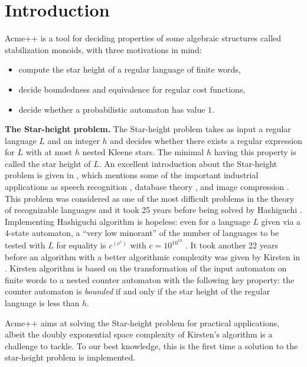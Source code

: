 \section{Introduction}

Acme++ is a tool for deciding properties of some algebraic structures called stabilization monoids,
with three motivations in mind:
\begin{itemize}
\item compute the star height of a regular language of finite words,
\item decide boundedness and equivalence for regular cost functions,
\item decide whether a probabilistic automaton has value $1$.
\end{itemize}

\textbf{The Star-height problem.} The Star-height problem \cite{Eggan63} takes as input a regular language $L$ and an integer $h$ and decides whether there exists a regular expression for $L$ with at most $h$ nested Kleene stars.
The minimal $h$ having this property is called the star height of $L$. 
An excellent introduction about the Star-height problem is given in \cite{Kirsten05},
which mentions some of the important industrial applications as
speech recognition \cite{Mohri97}, database theory \cite{GT01}, and image compression \cite{CK93,KMT04}.
This problem was considered as one of the most difficult problems in the theory of recognizable languages
and it took 25 years before being solved by Hashiguchi \cite{Hashiguchi88}.
Implementing Hashiguchi algorithm is hopeless: even for a language $L$ given via a $4$-state automaton, a ``very low minorant'' of the number of languages to be tested with $L$ for equality is  $ c^{(c^c)}$ with $c=10^{10^{10}}$ \cite{LS02}.
It took another 22 years before an algorithm with a better algorithmic complexity was given by Kirsten in \cite{Kirsten05}. Kirsten algorithm is based on the transformation of the input automaton on finite words to 
a nested counter automaton with the following key property: the counter automaton is \emph{bounded}
if and only if the star height of the regular language is less than $h$.

Acme++ aims at solving the Star-height problem for practical applications,
albeit the doubly exponential space complexity of Kirsten's algorithm is a challenge to tackle.
To our best knowledge, this is the first time a solution to the star-height problem is implemented.


